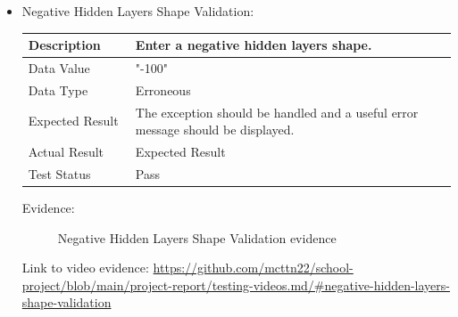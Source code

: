 \documentclass[./project-report/src/latex/project-report.tex]{subfiles}
\begin{document}
\begin{itemize}
		\pagebreak

	\item Negative Hidden Layers Shape Validation: \newline\newline
		\begin{tabular}{|p{0.25\linewidth}|p{0.75\linewidth}|}
			\hline
			Description & Enter a negative hidden layers shape. \\
			\hline
			Data Value & "-100" \\
			\hline
			Data Type & Erroneous \\
			\hline
			Expected Result & The exception should be handled and a useful error message should be displayed. \\
			\hline
			Actual Result & Expected Result \\
			\hline
			Test Status & Pass \\
			\hline
		\end{tabular}

		\vspace{5mm}

		Evidence:
		\begin{figure}[h!]
		\centering
		\caption{Negative Hidden Layers Shape Validation evidence}
		\end{figure}

		\begin{sloppypar}
		Link to video evidence: \url{https://github.com/mcttn22/school-project/blob/main/project-report/testing-videos.md/#negative-hidden-layers-shape-validation}
		\end{sloppypar}


\end{itemize}
\end{document}
